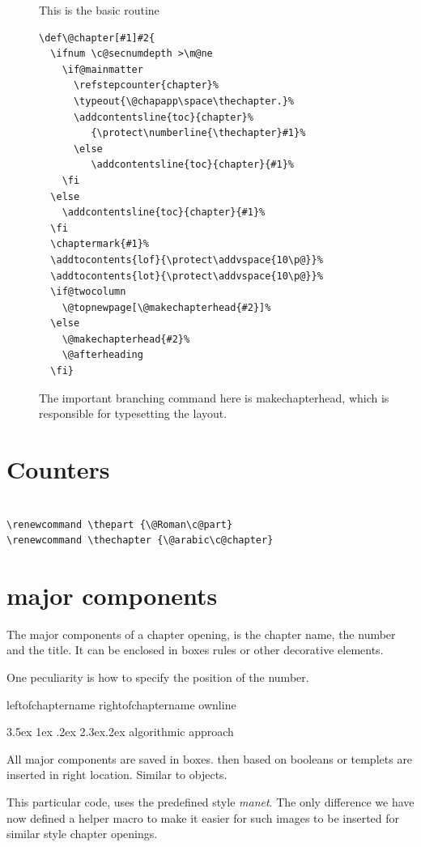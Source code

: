 \documentclass[a4paper]{book}
\makeatletter
\renewcommand\subsection{\@startsection {subsection}{1}{-5pt}%
                                   {3.5ex \@plus 1ex \@minus .2ex
                                   }%
                                   {2.3ex\@plus .2ex
                                   \vskip 0.2\p@ \vskip 1pt}%
                                   {\centering\sc\normalsize\color{black}}}
\def\chaptername{ Cap\'{\i}tulo}
\newif\if@lefttitle
\newif\if@righttitle
\newif\if@leftname
\newif\if@rightname
\newif\if@chapterspaceout\@chapterspaceoutfalse
\newif\if@titlespaceout\@chapterspaceoutfalse
\renewcommand\@makechapterhead[2][]{%
  \def\printnumber{%
    \numberbefore@cx
      {%
      \numbercolor@cx
      \numberfontsize@cx
      \numberfontfamily@cx
      \numberfontweight@cx
      \thechapter
      \numberpunctuation@cx
      }
      \numberafter@cx
  }%
  \def\printchaptername{%
    {
    \chapterfontfamily@cx
    \chapterfontsize@cx
    \chapterfontweight@cx
    \color{\chaptercolor@cx}
    \if@chapterspaceout 
     \expandafter\so\expandafter{\chaptername}
    \else
      \@chapapp\space
    \fi
    }%
  }%
    {%
    \parindent0pt 
    \normalfont%
    \ifnum \c@secnumdepth>\m@ne%
      \if@mainmatter%
         \chapterbefore@cx%
         \if@leftname
            \printnumber
         \fi%
         \printchaptername
         \if@rightname
            \printnumber
         \fi%
         \chapterafter@cx  
      \fi%
    \fi%
    \interlinepenalty\@M%
     \titlebeforeskip@cx%
     \if@lefttitle%
       \beforenumber@cx%
       \counterdisplay\c@chapter\afternumber@cx%
     \fi
      \titlefontfamily@cx
      \titlefontweight@cx
      \titlefontsize@cx
      \titlefontcolor@cx
      \selectfont
      \titlebefore@cx%
      \if@titlespaceout
         \so{#2}%
      \else
         #2
      \fi%
      \titleafter@cx
    \if@righttitle%
      \afternumber@cx
      \counterdisplay\c@chapter\afternumber@cx%
    \fi
    \par\nobreak%
    \titleafterskip@cx
    \thispagestyle{\headerstyle@cx}
}}
\newcounter{echap}
\makeatother
\begin{document}
\begin{description}
\item [\string\@chapter] This is the basic routine
\begin{verbatim}
\def\@chapter[#1]#2{
  \ifnum \c@secnumdepth >\m@ne
    \if@mainmatter
      \refstepcounter{chapter}%
      \typeout{\@chapapp\space\thechapter.}%
      \addcontentsline{toc}{chapter}%
         {\protect\numberline{\thechapter}#1}%
      \else
         \addcontentsline{toc}{chapter}{#1}%
    \fi
  \else
    \addcontentsline{toc}{chapter}{#1}%
  \fi
  \chaptermark{#1}%
  \addtocontents{lof}{\protect\addvspace{10\p@}}%
  \addtocontents{lot}{\protect\addvspace{10\p@}}%
  \if@twocolumn
    \@topnewpage[\@makechapterhead{#2}]%
  \else
    \@makechapterhead{#2}%
    \@afterheading
  \fi}
\end{verbatim}
  The important branching command here is makechapterhead,   which is responsible for typesetting the layout.

\end{description}

\section{Counters}
\begin{verbatim}

\renewcommand \thepart {\@Roman\c@part}
\renewcommand \thechapter {\@arabic\c@chapter}
\end{verbatim}



\section{major components}

The major components of a chapter opening, is the chapter name, the number and the title. It can be enclosed in boxes rules or other decorative elements. 

One peculiarity is how to specify the position of the number.

leftofchaptername rightofchaptername ownline 

\subsection{algorithmic approach}

All major components are saved in boxes. then based on booleans or templets are inserted in right location. Similar to objects.

This particular code, uses the predefined style \textit{manet}. The only difference we have now defined a helper macro to make it easier for such images to be inserted for similar style chapter openings.
\end{document}
